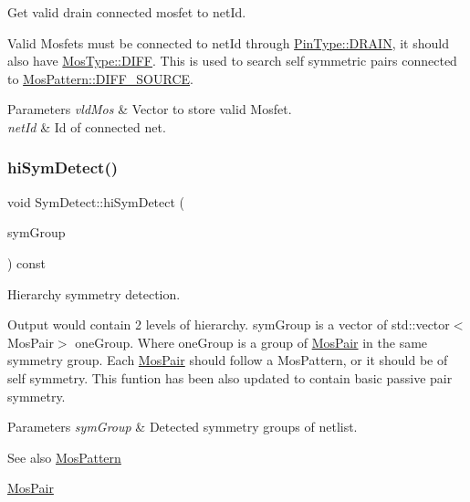Get valid drain connected mosfet to net\+Id. 

Valid Mosfets must be connected to net\+Id through \hyperlink{type_8h_afaab50027002ecbb6c8ac27e727d1bb4ad22e8f7ce637479aeffe9dab9ee7337d}{Pin\+Type\+::\+D\+R\+A\+IN}, it should also have \hyperlink{type_8h_a34a6a66323cfecf83dfe00bc8fd96333aa2e1ec2dd3d8195d238c5494f0ac5578}{Mos\+Type\+::\+D\+I\+FF}. This is used to search self symmetric pairs connected to \hyperlink{type_8h_af19eddb079bfea723256710b029c38e8ad45b64a7d6b85dde1b52dd5a18863933}{Mos\+Pattern\+::\+D\+I\+F\+F\+\_\+\+S\+O\+U\+R\+CE}.


\begin{DoxyParams}{Parameters}
{\em vld\+Mos} & Vector to store valid Mosfet. \\
\hline
{\em net\+Id} & Id of connected net. \\
\hline
\end{DoxyParams}
\mbox{\label{classSymDetect_a81ec317ab0f508b3e0af483ef8a2c1ac}} 
\subsubsection{\texorpdfstring{hi\+Sym\+Detect()}{hiSymDetect()}}
{\footnotesize\ttfamily void Sym\+Detect\+::hi\+Sym\+Detect (\begin{DoxyParamCaption}\item[{std\+::vector$<$ std\+::vector$<$ \hyperlink{classMosPair}{Mos\+Pair} $>$$>$ \&}]{sym\+Group }\end{DoxyParamCaption}) const}



Hierarchy symmetry detection. 

Output would contain 2 levels of hierarchy. sym\+Group is a vector of std\+::vector$<$\+Mos\+Pair$>$ one\+Group. Where one\+Group is a group of \hyperlink{classMosPair}{Mos\+Pair} in the same symmetry group. Each \hyperlink{classMosPair}{Mos\+Pair} should follow a Mos\+Pattern, or it should be of self symmetry. This funtion has been also updated to contain basic passive pair symmetry.


\begin{DoxyParams}{Parameters}
{\em sym\+Group} & Detected symmetry groups of netlist. \\
\hline
\end{DoxyParams}
\begin{DoxySeeAlso}{See also}
\hyperlink{type_8h_af19eddb079bfea723256710b029c38e8}{Mos\+Pattern} 

\hyperlink{classMosPair}{Mos\+Pair} 
\end{DoxySeeAlso}
\mbox{\label{classSymDetect_ae6a1ba27f6768f215cba0623b6e2ce08}} 

